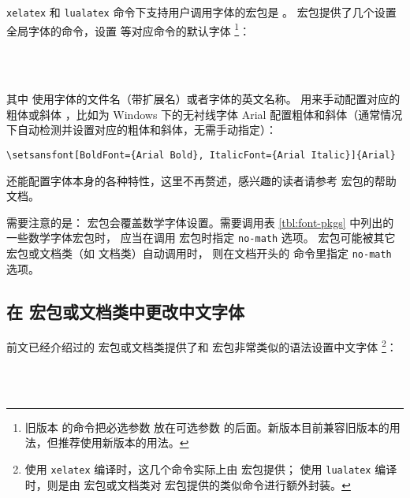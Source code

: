 \texttt{xelatex} 和 \texttt{lualatex} 命令下支持用户调用字体的宏包是 。
宏包提供了几个设置全局字体的命令，设置  等对应命令的默认字体%
\footnote{旧版本  的命令把必选参数  放在可选参数  的后面。新版本目前兼容旧版本的用法，但推荐使用新版本的用法。}：
\begin{command}
 \\
 \\
\end{command}
其中  使用字体的文件名（带扩展名）或者字体的英文名称。 用来手动配置对应的粗体或斜体
，比如为 Windows 下的无衬线字体 Arial 配置粗体和斜体（通常情况下自动检测并设置对应的粗体和斜体，无需手动指定）：
\begin{verbatim}
\setsansfont[BoldFont={Arial Bold}, ItalicFont={Arial Italic}]{Arial}
\end{verbatim}
 还能配置字体本身的各种特性，这里不再赘述，感兴趣的读者请参考  宏包的帮助文档。

需要注意的是： 宏包会覆盖数学字体设置。需要调用表 \ref{tbl:font-pkgs} 中列出的一些数学字体宏包时，
应当在调用  宏包时指定 \texttt{no-math} 选项。 宏包可能被其它宏包或文档类（如  文档类）自动调用时，
则在文档开头的  命令里指定 \texttt{no-math} 选项。

\subsection{在  宏包或文档类中更改中文字体}\label{subsec:CJKfont}

前文已经介绍过的  宏包或文档类提供了和  宏包非常类似的语法设置中文字体%
\footnote{使用 \texttt{xelatex} 编译时，这几个命令实际上由  宏包提供；
使用 \texttt{lualatex} 编译时，则是由  宏包或文档类对  宏包提供的类似命令进行额外封装。}：
\begin{command}
 \\
 \\
\end{command}

